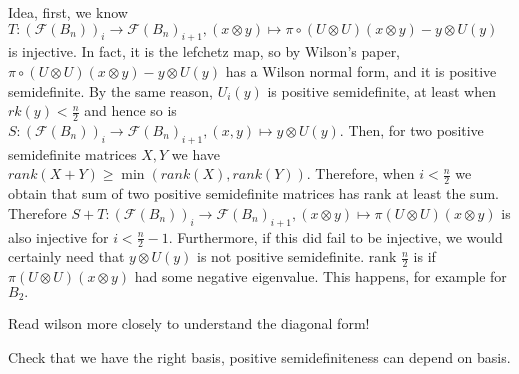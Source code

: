 \documentclass{amsart}
\begin{document}
Idea, first, we know $T:(\mathcal F(B_n))_i \rightarrow \mathcal F(B_n)_{i+1},(x\otimes y) \mapsto \pi \circ (U \otimes U)(x\otimes y) - y \otimes U(y)$ is injective. In fact, it is the lefchetz map, so by Wilson's paper, $\pi \circ (U \otimes U)(x\otimes y) - y \otimes U(y)$ has a Wilson normal form, and it is positive semidefinite. By the same reason, $U_i(y)$ is positive semidefinite, at least when $rk(y) < \frac{n}{2}$ and hence so is $S:(\mathcal F(B_n))_i \rightarrow \mathcal F(B_n)_{i+1},(x,y) \mapsto y \otimes U(y).$ Then, for two positive semidefinite matrices $X,Y$ we have $rank(X+Y) \geq \min (rank(X),rank(Y)).$ Therefore, when $i < \frac{n}{2}$ we obtain that  sum of two positive semidefinite matrices has rank at least the sum. Therefore $S+T:(\mathcal F(B_n))_i \rightarrow \mathcal F(B_n)_{i+1},(x \otimes y) \mapsto \pi(U\otimes U)(x \otimes y)$ is also injective for $i < \frac{n}{2}-1.$ Furthermore, if this did fail to be injective, we would certainly need that $y \otimes U(y)$ is not positive semidefinite. rank $\frac{n}{2}$ is if $ \pi(U\otimes U)(x \otimes y)$ had some negative eigenvalue. This happens, for example for $B_2.$

Read wilson more closely to understand the diagonal form!

Check that we have the right basis, positive semidefiniteness can depend on basis.
\end{document}
